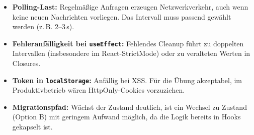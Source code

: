 \documentclass[a4paper,11pt]{article}
\newcommand{\code}[1]{\colorbox{codebg}{\texttt{\small #1}}}
\begin{document}
\begin{contraBox}
\begin{itemize}[leftmargin=*]
    \item \textbf{Polling-Last:} Regelmäßige Anfragen erzeugen
          Netzwerkverkehr, auch wenn keine neuen Nachrichten vorliegen. Das
          Intervall muss passend gewählt werden (z.\,B. 2--3\,s).
    \item \textbf{Fehleranfälligkeit bei \code{useEffect}:} Fehlendes
          Cleanup führt zu doppelten Intervallen (insbesondere im
          React-StrictMode) oder zu veralteten Werten in Closures.
    \item \textbf{Token in \code{localStorage}:} Anfällig bei XSS. Für die
          Übung akzeptabel, im Produktivbetrieb wären HttpOnly-Cookies
          vorzuziehen.
    \item \textbf{Migrationspfad:} Wächst der Zustand deutlich, ist ein
          Wechsel zu Zustand (Option B) mit geringem Aufwand möglich, da die
          Logik bereits in Hooks gekapselt ist.
\end{itemize}
\end{contraBox}
\end{document}

